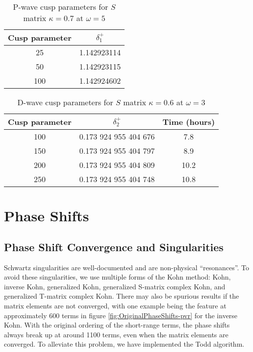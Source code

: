 \documentclass[Dissertation.tex]{subfiles}
\begin{document}
\begin{table}[H]
\centering
\begin{tabular}{c c}
\toprule
Cusp parameter & $\delta_1^+$ \\
\midrule
 25 & 1.142923114 \\
 50 & 1.142923115 \\
100 & 1.142924602 \\
\bottomrule
\end{tabular}
\caption{P-wave cusp parameters for $S$ matrix $\kappa = 0.7$ at $\omega = 5$}
\label{tab:PWaveCuspParameters}
\end{table}


\begin{table}[H]
\centering
\begin{tabular}{c c c}
\toprule
Cusp parameter & $\delta_2^+$ & Time (hours) \\
\midrule
100 & 0.173 924 955 404 676 & 7.8 \\
150 & 0.173 924 955 404 797 & 8.9 \\
200 & 0.173 924 955 404 809 & 10.2 \\
250 & 0.173 924 955 404 748 & 10.8 \\
\bottomrule
\end{tabular}
\caption{D-wave cusp parameters for $S$ matrix $\kappa = 0.6$ at $\omega = 3$}
\label{tab:DWaveCuspParameters}
\end{table}


\section{Phase Shifts}
\label{sec:CompPhase}

\subsection{Phase Shift Convergence and Singularities}
Schwartz singularities are well-documented \cite{Lucchese1989,Cooper2009} and are non-physical ``resonances''. To avoid these singularities, we use multiple forms of the Kohn method: Kohn, inverse Kohn, generalized Kohn, generalized S-matrix complex Kohn, and generalized T-matrix complex Kohn. There may also be spurious results if the matrix elements are not converged, with one example being the feature at approximately 600 terms in figure \ref{fig:OriginalPhaseShifts-pvr} for the inverse Kohn. With the original ordering of the short-range terms, the phase shifts always break up at around 1100 terms, even when the matrix elements are converged. To alleviate this problem, we have implemented the Todd algorithm.
\end{document}
